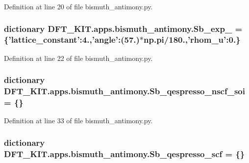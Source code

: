 Definition at line 20 of file bismuth\+\_\+antimony.\+py.

\hypertarget{namespace_d_f_t___k_i_t_1_1apps_1_1bismuth__antimony_a241f6ef77b95d1682e324b5c0e2ef2e9}{
\subsubsection[{Sb\+\_\+exp\+\_\+2}]{\setlength{\rightskip}{0pt plus 5cm}dictionary D\+F\+T\+\_\+\+K\+I\+T.\+apps.\+bismuth\+\_\+antimony.\+Sb\+\_\+exp\+\_ = \{'lattice\+\_\+constant'\+:4.,'angle'\+:(57.)$\ast$np.\+pi/180.,'rhom\+\_\+u'\+:0.\}}}\label{namespace_d_f_t___k_i_t_1_1apps_1_1bismuth__antimony_a241f6ef77b95d1682e324b5c0e2ef2e9}


Definition at line 22 of file bismuth\+\_\+antimony.\+py.

\hypertarget{namespace_d_f_t___k_i_t_1_1apps_1_1bismuth__antimony_a59fa5c238b4d21bbc0313b00f42bbfe9}{
\subsubsection[{Sb\+\_\+qespresso\+\_\+nscf\+\_\+soi}]{\setlength{\rightskip}{0pt plus 5cm}dictionary D\+F\+T\+\_\+\+K\+I\+T.\+apps.\+bismuth\+\_\+antimony.\+Sb\+\_\+qespresso\+\_\+nscf\+\_\+soi = \{\}}}\label{namespace_d_f_t___k_i_t_1_1apps_1_1bismuth__antimony_a59fa5c238b4d21bbc0313b00f42bbfe9}


Definition at line 33 of file bismuth\+\_\+antimony.\+py.

\hypertarget{namespace_d_f_t___k_i_t_1_1apps_1_1bismuth__antimony_a0e0f7c4aa8d0742ba96eaa32092c4d38}{
\subsubsection[{Sb\+\_\+qespresso\+\_\+scf}]{\setlength{\rightskip}{0pt plus 5cm}dictionary D\+F\+T\+\_\+\+K\+I\+T.\+apps.\+bismuth\+\_\+antimony.\+Sb\+\_\+qespresso\+\_\+scf = \{\}}}\label{namespace_d_f_t___k_i_t_1_1apps_1_1bismuth__antimony_a0e0f7c4aa8d0742ba96eaa32092c4d38}


